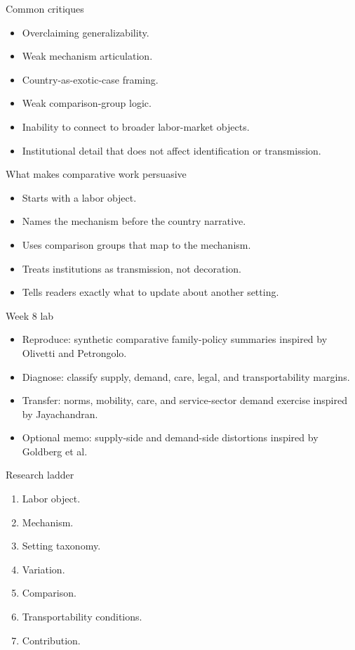 \documentclass[aspectratio=169,11pt]{beamer}
\begin{document}
\begin{frame}{Common critiques}
\begin{itemize}
    \item Overclaiming generalizability.
    \item Weak mechanism articulation.
    \item Country-as-exotic-case framing.
    \item Weak comparison-group logic.
    \item Inability to connect to broader labor-market objects.
    \item Institutional detail that does not affect identification or transmission.
\end{itemize}
\end{frame}

\begin{frame}{What makes comparative work persuasive}
\begin{itemize}
    \item Starts with a labor object.
    \item Names the mechanism before the country narrative.
    \item Uses comparison groups that map to the mechanism.
    \item Treats institutions as transmission, not decoration.
    \item Tells readers exactly what to update about another setting.
\end{itemize}
\end{frame}

\begin{frame}{Week 8 lab}
\begin{itemize}
    \item Reproduce: synthetic comparative family-policy summaries inspired by Olivetti and Petrongolo.
    \item Diagnose: classify supply, demand, care, legal, and transportability margins.
    \item Transfer: norms, mobility, care, and service-sector demand exercise inspired by Jayachandran.
    \item Optional memo: supply-side and demand-side distortions inspired by Goldberg et al.
\end{itemize}
\end{frame}

\begin{frame}{Research ladder}
\begin{enumerate}
    \item Labor object.
    \item Mechanism.
    \item Setting taxonomy.
    \item Variation.
    \item Comparison.
    \item Transportability conditions.
    \item Contribution.
\end{enumerate}
\end{frame}
\end{document}
